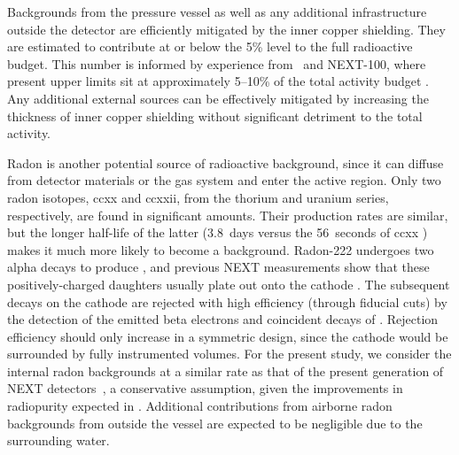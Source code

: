 Backgrounds from the pressure vessel as well as any additional infrastructure outside the detector are efficiently mitigated by the inner copper shielding. They are estimated to contribute at or below the 5\% level to the full radioactive budget. This number is informed by experience from \NEW\ and NEXT-100, where present upper limits sit at approximately 5--10\% of the total activity budget \cite{Martin-Albo:2015rhw, Novella:2019cne}. Any additional external sources can be effectively mitigated by increasing the thickness of inner copper shielding without significant detriment to the total activity.

Radon is another potential source of radioactive background, since it can diffuse from detector materials or the gas system and enter the active region. Only two radon isotopes, \Rn{220} and \Rn{222}, from the thorium and uranium series, respectively, are found in significant amounts. Their production rates are similar, but the longer half-life of the latter (3.8~days versus the 56~seconds of \Rn{220} \cite{nudat}) makes it much more likely to become a background. Radon-222 undergoes two alpha decays to produce , and previous NEXT measurements show that these positively-charged daughters usually plate out onto the cathode \cite{Novella:2018ewv}. The subsequent  decays on the cathode are rejected with high efficiency (through fiducial cuts) by the detection of the emitted beta electrons and coincident decays of . Rejection efficiency should only increase in a symmetric design, since the cathode would be surrounded by fully instrumented volumes. For the present study, we consider the internal radon backgrounds at a similar rate as that of the present generation of NEXT detectors~\cite{Novella:2018ewv}, a conservative assumption, given the improvements in radiopurity expected in \NHD. Additional contributions from airborne radon backgrounds from outside the vessel are expected to be negligible due to the surrounding water.


